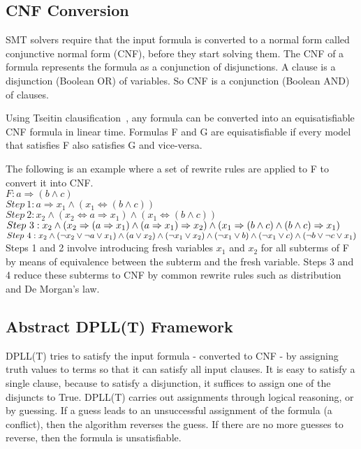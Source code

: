 \documentclass{article}
\begin{document}
\subsection{CNF Conversion}
\label{sec:cnf}
SMT solvers require that the input formula is converted to a 
normal form called conjunctive normal form (CNF), before they 
start solving them. The CNF of a formula represents the 
formula as a conjunction of disjunctions. A clause is a 
disjunction (Boolean OR) of variables. So CNF is a 
conjunction (Boolean AND) of clauses. 

Using Tseitin clausification~\cite{BEL01Handbook}, any formula 
can be converted into an equisatisfiable CNF formula 
in linear time. Formulas F and G are equisatisfiable if 
every model that satisfies F also satisfies G and vice-versa.

The following is an example where a set of rewrite rules
are applied to F to convert it into CNF. \\
$F: a \Rightarrow (b \land c)$ \\
$Step\ 1: a \Rightarrow x_1 \land (x_1 \iff (b \land c))$ \\
$Step\ 2: x_2 \land (x_2 \iff a \Rightarrow x_1) \land 
(x_1 \iff (b \land c))$ \\
$Step\ 3: x_2 \land \\
(x_2 \Rightarrow (a \Rightarrow x_1) \land 
(a \Rightarrow x_1) \Rightarrow x_2) \land \\
(x_1 \Rightarrow (b \land c) \land 
(b \land c) \Rightarrow x_1)$ \\
$Step\ 4: x_2 \land \\
(\neg x_2 \lor \neg a \lor x_1) \land 
(a \lor x_2) \land (\neg x_1 \lor x_2) \land \\
(\neg x_1 \lor b) \land (\neg x_1 \lor c) \land 
(\neg b \lor \neg c \lor x_1)$ \\
Steps 1 and 2 involve introducing fresh variables $x_1$
and $x_2$ for all subterms of F by means of equivalence 
between the subterm and the fresh variable. Steps 3 and 4 
reduce these subterms to CNF by common rewrite rules 
such as distribution and De Morgan's law.


\subsection{Abstract DPLL(T) Framework}
\label{sec:trans}
DPLL(T) tries to satisfy the input formula - converted to 
CNF - by assigning truth values to terms so that it can
satisfy all input clauses. It is easy to satisfy a single
clause, because to satisfy a disjunction, it suffices to
assign one of the disjuncts to True. DPLL(T) carries out
assignments through logical reasoning, or by guessing. If a
guess leads to an unsuccessful assignment of the formula 
(a conflict), then the algorithm reverses the guess. 
If there are no more guesses to reverse, then the formula is
unsatisfiable.
\end{document}
